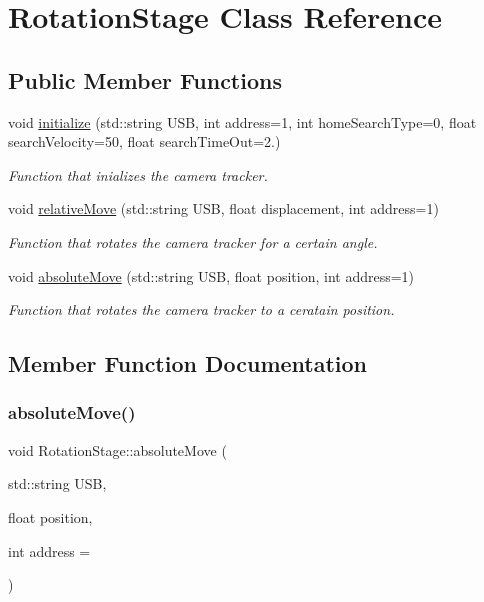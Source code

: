\hypertarget{classRotationStage}{}\section{Rotation\+Stage Class Reference}
\label{classRotationStage}
\subsection*{Public Member Functions}
\begin{DoxyCompactItemize}
\item 
void \hyperlink{classRotationStage_a47d308cbc52332ea2df332ecea062bae}{initialize} (std\+::string U\+SB, int address=1, int home\+Search\+Type=0, float search\+Velocity=50, float search\+Time\+Out=2.)
\begin{DoxyCompactList}\small\item\em Function that inializes the camera tracker. \end{DoxyCompactList}\item 
void \hyperlink{classRotationStage_a6f465da2aaca6b2dc6e808135e3c27e3}{relative\+Move} (std\+::string U\+SB, float displacement, int address=1)
\begin{DoxyCompactList}\small\item\em Function that rotates the camera tracker for a certain angle. \end{DoxyCompactList}\item 
void \hyperlink{classRotationStage_a999761588e3c6a2b2c94f9e5d03b42f2}{absolute\+Move} (std\+::string U\+SB, float position, int address=1)
\begin{DoxyCompactList}\small\item\em Function that rotates the camera tracker to a ceratain position. \end{DoxyCompactList}\end{DoxyCompactItemize}


\subsection{Member Function Documentation}
\mbox{\label{classRotationStage_a999761588e3c6a2b2c94f9e5d03b42f2}} 
\subsubsection{\texorpdfstring{absolute\+Move()}{absoluteMove()}}
{\footnotesize\ttfamily void Rotation\+Stage\+::absolute\+Move (\begin{DoxyParamCaption}\item[{std\+::string}]{U\+SB,  }\item[{float}]{position,  }\item[{int}]{address = {} }\end{DoxyParamCaption})}



